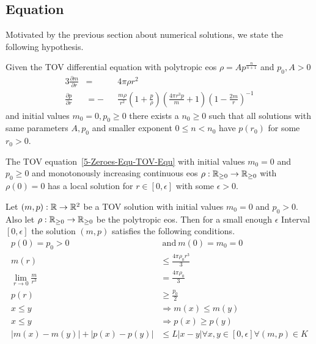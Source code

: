 \subsection{\texorpdfstring{}{TOV} Equation}
\label{subsec:5-Zeroes-TOV-Equ}
Motivated by the previous section about numerical solutions, we state the following hypothesis.
\begin{hypothesis}
	\label{theo:5-Zeroes-TOV-Zero-Value-Hypothesis}
	Given the \ac{TOV} differential equation with polytropic \ac{eos} $\rho=Ap^{\frac{n}{n+1}}$ and $p_0,A>0$
	\begin{alignat}{3}
		\frac{\partial m}{\partial r} &= &&4\pi\rho r^2\\
		\frac{\partial p}{\partial r} &= -&&\frac{m\rho}{r^2}\left(1+\frac{p}{\rho}\right)\left(\frac{4\pi r^3 p}{m}+1\right)\left(1-\frac{2m}{r}\right)^{-1}
		\label{5-Zeroes-Equ-TOV-Equ}
	\end{alignat}
	and initial values $m_0=0,p_0\geq0$ there exists a $n_0\geq0$ such that all solutions with same parameters $A,p_0$ and smaller exponent $0\leq n<n_0$ have $p(r_0)$ for some $r_0>0$.
\end{hypothesis}
\begin{lemma}
	The \ac{TOV} equation~\ref{5-Zeroes-Equ-TOV-Equ} with initial values $m_0=0$ and $p_0\geq0$ and monotonously increasing continuous \ac{eos} $\rho:\mathbb{R}_{\geq0}\rightarrow\mathbb{R}_{\geq0}$ with $\rho(0)=0$ has a local solution for $r\in[0,\epsilon]$ with some $\epsilon>0$.
\end{lemma}
\begin{lemma}
	\label{5-Zeroes-Lem-TOV-Conditions}
	Let $(m,p):\mathbb{R}\rightarrow\mathbb{R}^2$ be a \ac{TOV} solution with initial values $m_0=0$ and $p_0>0$.
	Also let $\rho:\mathbb{R}_{\geq0}\rightarrow\mathbb{R}_{\geq0}$ be the polytropic \ac{eos}.
	Then for a small enough $\epsilon$ Interval $[0,\epsilon]$ the solution $(m,p)$ satisfies the following conditions.
	\begin{align}
		p(0)=p_0>0 &\mathrm{\ and\ } m(0)=m_0=0\label{5-Zeroes-Equ-TOV-Conditions-0}\\
		m(r) &\leq \frac{4\pi\rho_0 r^3}{3}\label{5-Zeroes-Equ-TOV-Conditions-1}\\
		\lim_{r\rightarrow0}\frac{m}{r^3}&=\frac{4\pi\rho_0}{3}\label{5-Zeroes-Equ-TOV-Conditions-2}\\
		p(r)&\geq\frac{p_0}{2}\label{5-Zeroes-Equ-TOV-Conditions-3}\\
		x\leq y&\Rightarrow m(x)\leq m(y)\label{5-Zeroes-Equ-TOV-Conditions-4}\\
		x\leq y&\Rightarrow p(x)\geq p(y)\label{5-Zeroes-Equ-TOV-Conditions-5}\\
		|m(x)-m(y)|+|p(x)-p(y)|&\leq L|x-y|\forall x,y\in[0,\epsilon]\forall(m,p)\in K\label{5-Zeroes-Equ-TOV-Conditions-6}
	\end{align}
\end{lemma}
